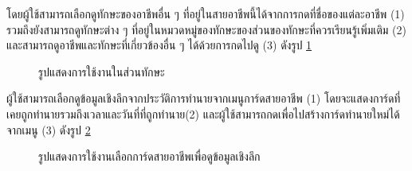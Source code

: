 โดยผู้ใช้สามารถเลือกดูทักษะของอาชีพอื่น ๆ ที่อยู่ในสายอาชีพนี้ได้จากการกดที่ชื่อของแต่ละอาชีพ (1) รวมถึงยังสามารถดูทักษะต่าง ๆ ที่อยู่ในหมวดหมู่ของทักษะของส่วนของทักษะที่ควรเรียนรู้เพิ่มเติม (2) และสามารถดูอาชีพและทักษะที่เกี่ยวข้องอื่น ๆ ได้ด้วยการกดไปดู (3) ดังรูป \ref{fig:skillaction-CI}
\begin{figure}[H]\centering
    \caption{รูปแสดงการใช้งานในส่วนทักษะ}\label{fig:skillaction-CI}
\end{figure}
ผู้ใช้สามารถเลือกดูข้อมูลเชิงลึกจากประวัติการทำนายจากเมนูการ์ดสายอาชีพ (1) โดยจะแสดงการ์ดที่เคยถูกทำนายรวมถึงเวลาและวันที่ที่ถูกทำนาย(2) และผู้ใช้สามารถกดเพื่อไปสร้างการ์ดทำนายใหม่ได้จากเมนู (3) ดังรูป \ref{fig:cardhistory-CI}
\begin{figure}[H]\centering
    \caption{รูปแสดงการใช้งานเลือกการ์ดสายอาชีพเพื่อดูข้อมูลเชิงลึก}\label{fig:cardhistory-CI}
\end{figure}

